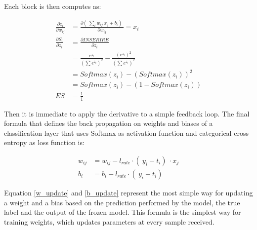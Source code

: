 \documentclass[12pt]{report}
\begin{document}
Each block is then computes as:

\begin{align}
	\frac{\partial z_i}{\partial w_{ij}} &= \frac{ \partial (\ \sum_i w_{ij} \: x_j + b_i )\ }{ \partial w_{ij}} = x_i \\[10pt]
	\frac{\partial S_i}{\partial z_i} &= \frac{\partial INSERIRE}{\partial z_i} \nonumber \\
	&= \frac{e^{z_i}}{(\sum e^{z_i})^2}- \frac{(e^{z_i})^2}{(\sum e^{z_i})^2} \nonumber \\
	&= Softmax(z_i) - (Softmax(z_i))^2 \nonumber \\
	&= Softmax(z_i) - (1-Softmax(z_i)) \\[10pt]
	ES &= \frac{1}{1} 
\end{align}

Then it is immediate to apply the derivative to a simple feedback loop. The final formula that defines the back propagation on weights and biases of a classification layer that uses Softmax as activation function and categorical cross entropy as loss function is:

\begin{align}
w_{ij} &= w_{ij} - l_{rate} \cdot (\ y_i-t_i )\ \cdot x_j \label{w_update} \\
b_i    &= b_i    - l_{rate} \cdot (\ y_i-t_i )\ \label{b_update} 
\end{align}

Equation \ref{w_update} and \ref{b_update} represent the most simple way for updating a weight and a bias based on the prediction performed by the model, the true label and the output of the frozen model. This formula is the simplest way for training weights, which updates parameters at every sample received.
\end{document}
